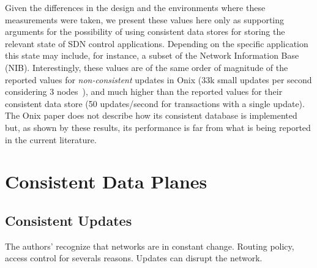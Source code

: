 Given the differences in the design and the environments where these measurements were taken, we present these values here only as supporting arguments for the possibility of using consistent data stores for storing the relevant state of SDN control applications.
Depending on the specific application this state may include, for instance, a subset of the Network Information Base (NIB).
Interestingly, these values are of the same order of magnitude of the reported values for \emph{non-consistent} updates in Onix (33k small updates per second considering 3 nodes~\cite{Koponen:2010th}), and much higher than the reported values for their consistent data store (50 updates/second for transactions with a single update).
The Onix paper does not describe how its consistent database is implemented but, as shown by these results, its performance is far from what is being reported in the current literature.

\glsresetall
\section{Consistent Data Planes}
\label{sec:related:consistent-data-plane}


\subsection{Consistent Updates}
The authors' recognize that networks are in constant change. 
Routing policy, access control for severals reasons. 
Updates can disrupt the network. 

